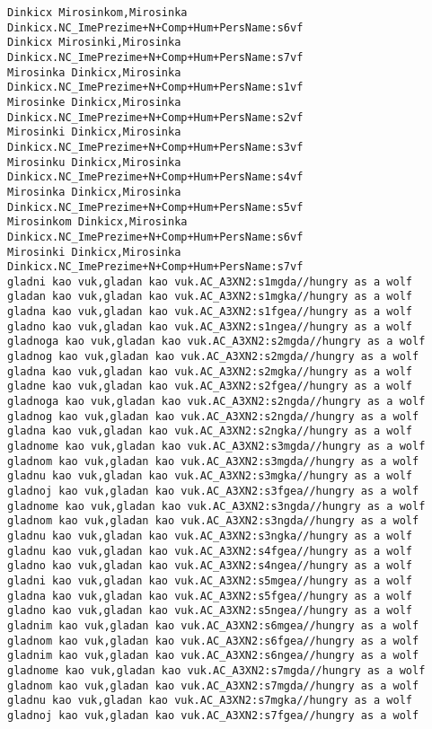 \begin{verbatim}
Dinkicx Mirosinkom,Mirosinka Dinkicx.NC_ImePrezime+N+Comp+Hum+PersName:s6vf
Dinkicx Mirosinki,Mirosinka Dinkicx.NC_ImePrezime+N+Comp+Hum+PersName:s7vf
Mirosinka Dinkicx,Mirosinka Dinkicx.NC_ImePrezime+N+Comp+Hum+PersName:s1vf
Mirosinke Dinkicx,Mirosinka Dinkicx.NC_ImePrezime+N+Comp+Hum+PersName:s2vf
Mirosinki Dinkicx,Mirosinka Dinkicx.NC_ImePrezime+N+Comp+Hum+PersName:s3vf
Mirosinku Dinkicx,Mirosinka Dinkicx.NC_ImePrezime+N+Comp+Hum+PersName:s4vf
Mirosinka Dinkicx,Mirosinka Dinkicx.NC_ImePrezime+N+Comp+Hum+PersName:s5vf
Mirosinkom Dinkicx,Mirosinka Dinkicx.NC_ImePrezime+N+Comp+Hum+PersName:s6vf
Mirosinki Dinkicx,Mirosinka Dinkicx.NC_ImePrezime+N+Comp+Hum+PersName:s7vf
gladni kao vuk,gladan kao vuk.AC_A3XN2:s1mgda//hungry as a wolf
gladan kao vuk,gladan kao vuk.AC_A3XN2:s1mgka//hungry as a wolf
gladna kao vuk,gladan kao vuk.AC_A3XN2:s1fgea//hungry as a wolf
gladno kao vuk,gladan kao vuk.AC_A3XN2:s1ngea//hungry as a wolf
gladnoga kao vuk,gladan kao vuk.AC_A3XN2:s2mgda//hungry as a wolf
gladnog kao vuk,gladan kao vuk.AC_A3XN2:s2mgda//hungry as a wolf
gladna kao vuk,gladan kao vuk.AC_A3XN2:s2mgka//hungry as a wolf
gladne kao vuk,gladan kao vuk.AC_A3XN2:s2fgea//hungry as a wolf
gladnoga kao vuk,gladan kao vuk.AC_A3XN2:s2ngda//hungry as a wolf
gladnog kao vuk,gladan kao vuk.AC_A3XN2:s2ngda//hungry as a wolf
gladna kao vuk,gladan kao vuk.AC_A3XN2:s2ngka//hungry as a wolf
gladnome kao vuk,gladan kao vuk.AC_A3XN2:s3mgda//hungry as a wolf
gladnom kao vuk,gladan kao vuk.AC_A3XN2:s3mgda//hungry as a wolf
gladnu kao vuk,gladan kao vuk.AC_A3XN2:s3mgka//hungry as a wolf
gladnoj kao vuk,gladan kao vuk.AC_A3XN2:s3fgea//hungry as a wolf
gladnome kao vuk,gladan kao vuk.AC_A3XN2:s3ngda//hungry as a wolf
gladnom kao vuk,gladan kao vuk.AC_A3XN2:s3ngda//hungry as a wolf
gladnu kao vuk,gladan kao vuk.AC_A3XN2:s3ngka//hungry as a wolf
gladnu kao vuk,gladan kao vuk.AC_A3XN2:s4fgea//hungry as a wolf
gladno kao vuk,gladan kao vuk.AC_A3XN2:s4ngea//hungry as a wolf
gladni kao vuk,gladan kao vuk.AC_A3XN2:s5mgea//hungry as a wolf
gladna kao vuk,gladan kao vuk.AC_A3XN2:s5fgea//hungry as a wolf
gladno kao vuk,gladan kao vuk.AC_A3XN2:s5ngea//hungry as a wolf
gladnim kao vuk,gladan kao vuk.AC_A3XN2:s6mgea//hungry as a wolf
gladnom kao vuk,gladan kao vuk.AC_A3XN2:s6fgea//hungry as a wolf
gladnim kao vuk,gladan kao vuk.AC_A3XN2:s6ngea//hungry as a wolf
gladnome kao vuk,gladan kao vuk.AC_A3XN2:s7mgda//hungry as a wolf
gladnom kao vuk,gladan kao vuk.AC_A3XN2:s7mgda//hungry as a wolf
gladnu kao vuk,gladan kao vuk.AC_A3XN2:s7mgka//hungry as a wolf
gladnoj kao vuk,gladan kao vuk.AC_A3XN2:s7fgea//hungry as a wolf

\end{verbatim}
